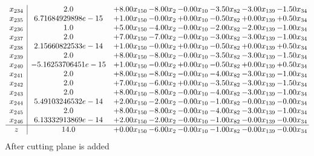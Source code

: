 \documentclass[8pt]{article}
\begin{document}
\[\begin{array}{c| c c@{\hskip 2pt} c@{\hskip 2pt} c@{\hskip 2pt} c@{\hskip 2pt} c@{\hskip 2pt} c@{\hskip 2pt} }
 x_{234}   &  2.0 & +  8.00 x_{150} & -8.00 x_{2} & -0.00 x_{10} & -3.50 x_{82} & -3.00 x_{139} & -1.50 x_{34}\\
 x_{235}   &  6.71684929898e-15 & +  1.00 x_{150} & -0.00 x_{2} & +  0.00 x_{10} & -0.50 x_{82} & +  0.00 x_{139} & +  0.50 x_{34}\\
 x_{236}   &  1.0 & +  5.00 x_{150} & -4.00 x_{2} & -0.00 x_{10} & -2.00 x_{82} & -2.00 x_{139} & -1.00 x_{34}\\
 x_{237}   &  2.0 & +  7.00 x_{150} & -7.00 x_{2} & -0.00 x_{10} & -3.00 x_{82} & -3.00 x_{139} & -1.00 x_{34}\\
 x_{238}   &  2.15660822533e-14 & +  1.00 x_{150} & -0.00 x_{2} & +  0.00 x_{10} & -0.50 x_{82} & +  0.00 x_{139} & +  0.50 x_{34}\\
 x_{239}   &  2.0 & +  8.00 x_{150} & -8.00 x_{2} & -0.00 x_{10} & -3.50 x_{82} & -3.00 x_{139} & -1.50 x_{34}\\
 x_{240}   &  -5.16253706451e-15 & +  1.00 x_{150} & -0.00 x_{2} & +  0.00 x_{10} & -0.50 x_{82} & +  0.00 x_{139} & +  0.50 x_{34}\\
 x_{241}   &  2.0 & +  8.00 x_{150} & -8.00 x_{2} & -0.00 x_{10} & -4.00 x_{82} & -3.00 x_{139} & -1.00 x_{34}\\
 x_{242}   &  2.0 & +  7.00 x_{150} & -6.00 x_{2} & +  0.00 x_{10} & -3.50 x_{82} & -3.00 x_{139} & -1.50 x_{34}\\
 x_{243}   &  2.0 & +  8.00 x_{150} & -8.00 x_{2} & -0.00 x_{10} & -4.00 x_{82} & -3.00 x_{139} & -1.00 x_{34}\\
 x_{244}   &  5.49103246532e-14 & +  2.00 x_{150} & -2.00 x_{2} & -0.00 x_{10} & -1.00 x_{82} & -0.00 x_{139} & -0.00 x_{34}\\
 x_{245}   &  2.0 & +  8.00 x_{150} & -8.00 x_{2} & -0.00 x_{10} & -4.00 x_{82} & -3.00 x_{139} & -1.00 x_{34}\\
 x_{246}   &  6.13332913869e-14 & +  2.00 x_{150} & -2.00 x_{2} & -0.00 x_{10} & -1.00 x_{82} & -0.00 x_{139} & -0.00 x_{34}\\
\hline
z    &  14.0 & +  0.00 x_{150} & -6.00 x_{2} & -0.00 x_{10} & -1.00 x_{82} & -0.00 x_{139} & -0.00 x_{34}\\
\end{array}\]
 After cutting plane is added 
\end{document}
